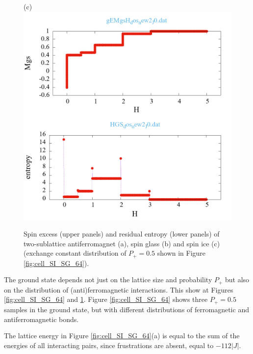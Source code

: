 \documentclass[preprint,12pt]{elsarticle}
\begin{document}
\begin{figure}[H]
\begin{minipage}[h]{0.32\linewidth}
		\end{minipage}
		\hfill
		\begin{minipage}[h]{0.32\linewidth}
			\centering
			\hspace{1cm}(c)
			\includegraphics[width=1\linewidth]{pictures/_multiplot_SI64_J0}
		\end{minipage}
		
		\caption{Spin excess (upper panels) and residual entropy (lower panels) of two-sublattice antiferromagnet (a), spin glass (b) and spin ice (c) (exchange constant distribution of $P_+ = 0.5$ shown in Figure \ref{fig:cell_SI_SG_64}).}
		\label{fig:_multiplot_SI_SG_64}
		
	\end{figure}
	
	The ground state depends not just on the lattice size and probability $P_+$ but also on the distribution of (anti)ferromagnetic interactions. This show at Figures \ref{fig:cell_SI_SG_64} and \ref{fig:_multiplot_SI_SG_64}. Figure \ref{fig:cell_SI_SG_64} shows three $P_+ = 0.5$ samples in the ground state, but with different distributions of ferromagnetic and antiferromagnetic bonds.
	
	The lattice energy in Figure \ref{fig:cell_SI_SG_64}(a) is equal to the sum of the energies of all interacting pairs, since frustrations are absent, equal to $-112|J|$.
	
\end{document}
